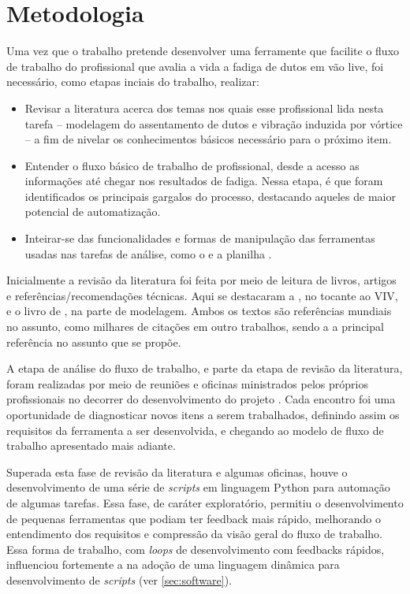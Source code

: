 \chapter{Metodologia}\label{chap:metodologia}


Uma vez que o trabalho pretende desenvolver uma ferramente que facilite o fluxo de trabalho do profissional que avalia a vida a fadiga de dutos em vão live, foi necessário, como etapas inciais do trabalho, realizar:

\begin{itemize}
    \item Revisar a literatura acerca dos temas nos quais esse profissional lida nesta tarefa -- modelagem do assentamento de dutos e vibração induzida por vórtice -- a fim de nivelar os conhecimentos básicos necessário para o próximo item.
    \item Entender o fluxo básico de trabalho de profissional, desde a acesso as informações até chegar nos resultados de fadiga. Nessa etapa, é que foram identificados os principais gargalos do processo, destacando aqueles de maior potencial de automatização.
    \item Inteirar-se das funcionalidades e formas de manipulação das ferramentas usadas nas tarefas de análise, como o \abaqus e a planilha \fatfree.
\end{itemize}

Inicialmente a revisão da literatura foi feita por meio de leitura de livros, artigos e referências/recomendações técnicas.
Aqui se destacaram a , no tocante ao VIV, e o livro de , na parte de modelagem.
Ambos os textos são referências mundiais no assunto, como milhares de citações em outro trabalhos, sendo a  a principal referência no assunto que se propõe.

A etapa de análise do fluxo de trabalho, e parte da etapa de revisão da literatura, foram realizadas por meio de reuniões e oficinas ministrados pelos próprios profissionais no decorrer do desenvolvimento do projeto \integrispan.
Cada encontro foi uma oportunidade de diagnosticar novos itens a serem trabalhados, definindo assim os requisitos da ferramenta a ser desenvolvida, e chegando ao modelo de fluxo de trabalho apresentado mais adiante.

Superada esta fase de revisão da literatura e algumas oficinas, houve o desenvolvimento de uma série de \textit{scripts} em linguagem Python para automação de algumas tarefas.
Essa fase, de caráter exploratório, permitiu o desenvolvimento de pequenas ferramentas que podiam ter feedback mais rápido, melhorando o entendimento dos requisitos e compressão da visão geral do fluxo de trabalho.
Essa forma de trabalho, com \textit{loops} de desenvolvimento com feedbacks rápidos, influenciou fortemente a na adoção de uma linguagem dinâmica para desenvolvimento de \textit{scripts} (ver \autoref{sec:software}).


